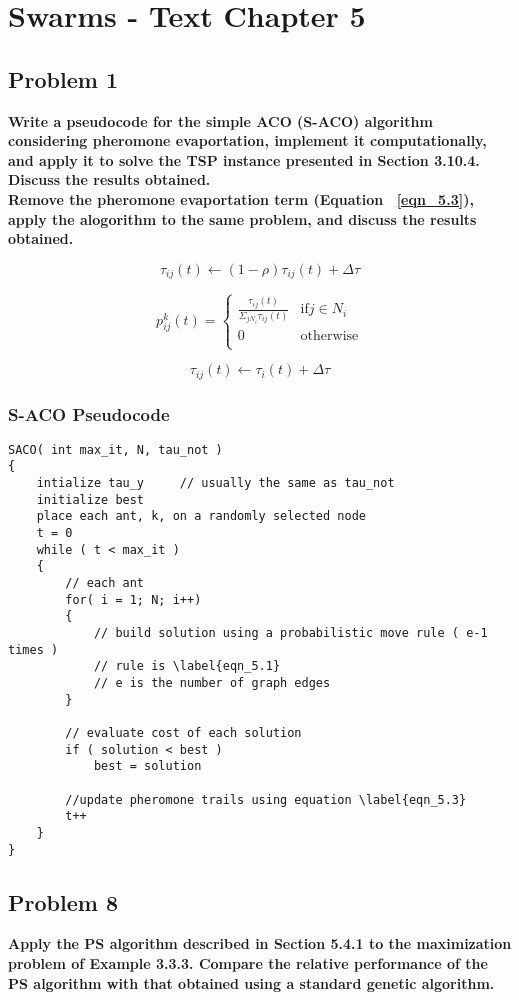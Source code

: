 
\chapter{Swarms - Text Chapter 5}

\section{ Problem 1 }
\textbf{Write a pseudocode for the simple ACO (S-ACO) algorithm considering pheromone evaportation, implement it computationally, and apply it to solve the TSP instance presented in Section 3.10.4. Discuss the results obtained.} \newline \\
\textbf{Remove the pheromone evaportation term (Equation ~\ref{eqn_5.3}), apply the alogorithm to the same problem, and discuss the results obtained.}

\begin{equation} \label{eqn_5.3}
\tau_{ij}(t) \leftarrow ( 1-\rho ) \tau_{ij}(t) + \Delta \tau
\end{equation}


\begin{equation} \label{eqn_5.1}

p_{ij}^{k}(t) = 
	\begin{cases}

	\frac{ \tau_{ij}(t) } { \Sigma_{j N_i } \tau_{ij}(t)} & \text{if} j \in N_i \\
	0 	& \text{otherwise} \\

	\end{cases}

\end{equation}


\begin{equation} \label{eqn_5.2}
\tau_{ij}(t) \leftarrow \tau_i(t) + \Delta \tau
\end{equation}

\subsection{ S-ACO Pseudocode }
\begin{lstlisting}
SACO( int max_it, N, tau_not )
{
	intialize tau_y 	// usually the same as tau_not
	initialize best
	place each ant, k, on a randomly selected node
	t = 0
	while ( t < max_it )
	{
		// each ant
		for( i = 1; N; i++)
		{
			// build solution using a probabilistic move rule ( e-1 times )
			// rule is \label{eqn_5.1}
			// e is the number of graph edges
		}
		
		// evaluate cost of each solution
		if ( solution < best )
			best = solution

		//update pheromone trails using equation \label{eqn_5.3}
		t++
	}
}
\end{lstlisting}


\section{ Problem 8 }
\textbf{Apply the PS algorithm described in Section 5.4.1 to the maximization problem of Example 3.3.3. Compare the relative performance of the PS algorithm with that obtained using a standard genetic algorithm.}